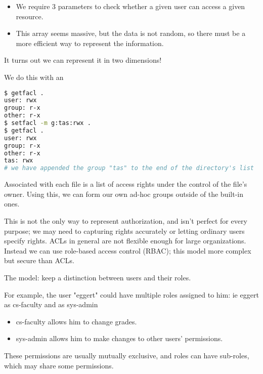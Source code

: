 \documentclass[../../lecture_notes.tex]{subfiles}
\begin{document}
\begin{minipage}{0.4\linewidth}
\centering
{}
\end{minipage}%
\begin{minipage}{0.6\linewidth}
\begin{itemize}
\item We require 3 parameters to check whether a given user can access a given resource.
\item This array seems massive, but the data is not random, so there must be a more efficient way to represent the information.
\end{itemize}
It turns out we can represent it in two dimensions!
\end{minipage}


We do this with an 
\begin{lstlisting}[language=sh]
$ getfacl .
user: rwx
group: r-x
other: r-x
$ setfacl -m g:tas:rwx .
$ getfacl .
user: rwx
group: r-x
other: r-x
tas: rwx
# we have appended the group "tas" to the end of the directory's list
\end{lstlisting}

Associated with each file is a list of access rights under the control of the file’s owner. Using this, we can form our own ad-hoc groups outside of the built-in ones.

This is not the only way to represent authorization, and isn’t perfect for every purpose; we may need to capturing rights accurately or letting ordinary users specify rights. ACLs in general are not flexible enough for large organizations. Instead we can use role-based access control (RBAC); this model more complex but secure than ACLs.

The model: keep a distinction between users and their roles. 

For example, the user "eggert" could have multiple roles assigned to him: ie eggert as cs-faculty and as sys-admin
\begin{itemize}
\item cs-faculty allows him to change grades. 
\item sys-admin allows him to make changes to other users' permissions.
\end{itemize}
These permissions are usually mutually exclusive, and roles can have sub-roles, which may share some permissions.
\end{document}
